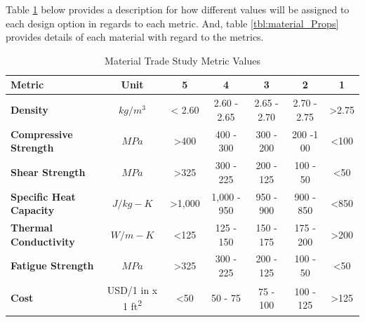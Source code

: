 Table \ref{tbl:material_Metric_Scores} below provides a description for how different values will be assigned to each design option in regards to each metric. And, table \ref{tbl:material_Props} provides details of each material with regard to the metrics.

\begin{table}[H]
\centering
\begin{tabular}{|l|c|c|c|c|c|c|} 
\hline
    \textbf{Metric} & \textbf{Unit} & \textbf{5} & \textbf{4} & \textbf{3} & \textbf{2} & \textbf{1}
    \\
\hline
    \textbf{Density} & $kg/{m^3}$ & < 2.60 & 2.60 - 2.65 & 2.65 - 2.70 & 2.70 - 2.75 & >2.75
    \\
\hline
    \textbf{Compressive Strength} & $MPa$ & >400 & 400 - 300 & 300 - 200 & 200 -1 00 & <100 
    \\
\hline
    \textbf{Shear Strength} & $MPa$ & >325 & 300 - 225 & 200 - 125 & 100 - 50 & <50
    \\
\hline
    \textbf{Specific Heat Capacity} & $J/{kg-K}$ & >1,000 & 1,000 - 950 & 950 - 900 & 900 - 850 & <850 
    \\
\hline
    \textbf{Thermal Conductivity} & $W/{m-K}$ & <125 & 125 - 150 & 150 - 175 & 175 - 200 & >200 
    \\
\hline
    \textbf{Fatigue Strength} & $MPa$ & >325 & 300 - 225 & 200 - 125 & 100 - 50 & <50
    \\
\hline
    \textbf{Cost} & USD/1 in x 1 ft\textsuperscript{2} & <50 & 50 - 75 & 75 - 100 & 100 - 125 & >125
    \\

\hline
\end{tabular}
\caption{Material Trade Study Metric Values}
\label{tbl:material_Metric_Scores}
\end{table}

